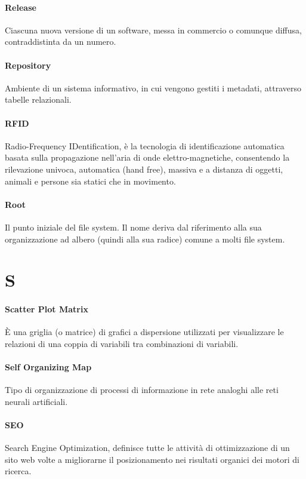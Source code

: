\documentclass[]{article}
\begin{document}
	\paragraph*{Release}
	Ciascuna nuova versione di un software, messa in commercio o comunque diffusa, contraddistinta da un numero.

	\paragraph*{Repository}
	Ambiente di un sistema informativo, in cui vengono gestiti i metadati, attraverso tabelle relazionali.

	\paragraph*{RFID}
	Radio-Frequency IDentification, è la tecnologia di identificazione automatica basata sulla propagazione nell'aria di onde elettro-magnetiche, consentendo la rilevazione univoca, automatica (hand free), massiva e a distanza di oggetti, animali e persone sia statici che in movimento.

	\paragraph*{Root}
	Il punto iniziale del file system. Il nome deriva dal riferimento alla sua organizzazione ad albero (quindi alla sua radice) comune a molti file system.

	\newpage

	\section*{S}

	\paragraph*{Scatter Plot Matrix}
	È una griglia (o matrice) di grafici a dispersione utilizzati per visualizzare le relazioni di una coppia di variabili tra combinazioni di variabili.

	\paragraph*{Self Organizing Map}
	Tipo di organizzazione di processi di informazione in rete analoghi alle reti neurali artificiali.

	\paragraph*{SEO}
	Search Engine Optimization, definisce tutte le attività di ottimizzazione di un sito web volte a migliorarne il posizionamento nei risultati organici dei motori di ricerca.
\end{document}
